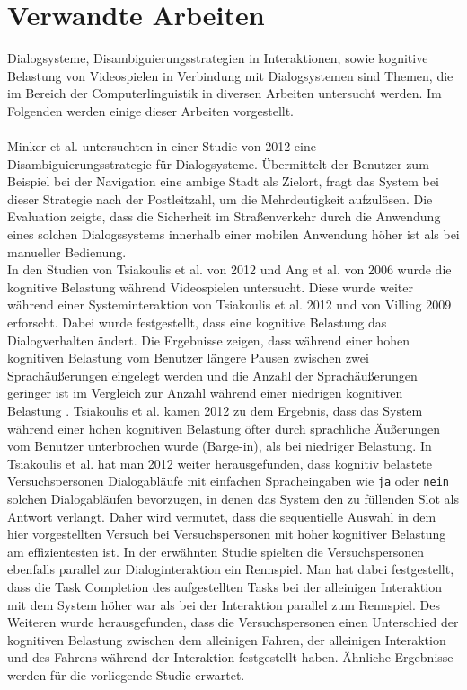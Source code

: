 \documentclass[12pt,a4paper]{scrartcl}
\begin{document}
\newpage
\section{Verwandte Arbeiten}

Dialogsysteme, Disambiguierungsstrategien in Interaktionen, sowie kognitive Belastung von Videospielen in Verbindung mit Dialogsystemen sind Themen, die im Bereich der Computerlinguistik in diversen Arbeiten untersucht werden. Im Folgenden werden einige dieser Arbeiten vorgestellt. \\
\\
Minker et al. untersuchten in einer Studie von 2012 eine Disambiguierungsstrategie für Dialogsysteme. Übermittelt der Benutzer zum Beispiel bei der Navigation eine ambige Stadt als Zielort, fragt das System bei dieser Strategie nach der Postleitzahl, um die Mehrdeutigkeit aufzulösen. Die Evaluation zeigte, dass die Sicherheit im Straßenverkehr durch die Anwendung eines solchen Dialogssystems innerhalb einer mobilen Anwendung höher ist als bei manueller Bedienung.  \\
In den Studien von Tsiakoulis et al. von 2012 und Ang et al. von 2006 wurde die kognitive Belastung während Videospielen untersucht. Diese wurde weiter während einer Systeminteraktion von Tsiakoulis et al. 2012 und von Villing 2009 erforscht. Dabei wurde festgestellt, dass eine kognitive Belastung das Dialogverhalten ändert. Die Ergebnisse zeigen, dass während einer hohen kognitiven Belastung vom Benutzer längere Pausen zwischen zwei Sprachäußerungen eingelegt werden und die Anzahl der Sprachäußerungen geringer ist im Vergleich zur Anzahl während einer niedrigen kognitiven Belastung \cite{DbCL}.
Tsiakoulis et al. kamen 2012 zu dem Ergebnis, dass das System während einer hohen kognitiven Belastung öfter durch sprachliche Äußerungen vom Benutzer unterbrochen wurde (Barge-in), als bei niedriger Belastung.
In Tsiakoulis et al.  hat man 2012 weiter herausgefunden, dass kognitiv belastete Versuchspersonen Dialogabläufe mit einfachen Spracheingaben wie \texttt{ja} oder \texttt{nein} solchen Dialogabläufen bevorzugen, in denen das System den zu füllenden Slot als Antwort verlangt. Daher wird vermutet, dass die sequentielle Auswahl in dem hier vorgestellten Versuch bei Versuchspersonen mit hoher kognitiver Belastung am effizientesten ist.  In der erwähnten Studie spielten die Versuchspersonen ebenfalls parallel zur Dialoginteraktion ein Rennspiel. Man hat dabei festgestellt, dass die Task Completion des aufgestellten Tasks bei der alleinigen Interaktion mit dem System höher war als bei der Interaktion parallel zum Rennspiel. Des Weiteren wurde herausgefunden, dass die Versuchspersonen einen Unterschied der kognitiven Belastung zwischen dem alleinigen Fahren, der alleinigen Interaktion und des Fahrens während der Interaktion festgestellt haben. Ähnliche Ergebnisse werden für die vorliegende Studie erwartet. \\
\end{document}
